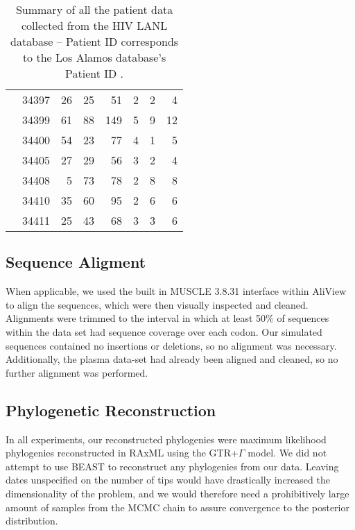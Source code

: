 \begin{table*}[!ht]
\begin{center}
\begin{tabular}{llrrrrrr}
& 34397 &      26 &       25 &       51 &        2 &        2 &        4  \\ 
& 34399 &      61 &       88 &      149 &        5 &        9 &       12  \\ 
& 34400 &      54 &       23 &       77 &        4 &        1 &        5  \\ 
& 34405 &      27 &       29 &       56 &        3 &        2 &        4  \\ 
& 34408 &       5 &       73 &       78 &        2 &        8 &        8 \\ 
& 34410 &      35 &       60 &       95 &        2 &        6 &        6 \\ 
& 34411 &      25 &       43 &       68 &        3 &        3 &        6   \\ \hline
\end{tabular}
\end{center}
  \caption{Summary of all the patient data collected from the HIV LANL database -- Patient ID corresponds to the Los Alamos database's Patient ID \citep{LosAlamos}.
   }\label{tab:patients} 
\end{table*}

\subsection{Sequence Aligment} \label{subsec:seqalign}
When applicable, we used the built in MUSCLE 3.8.31 \citep{Muscle04} interface within AliView \citep{AliView14} to align the sequences, which were then visually inspected and cleaned. 
Alignments were trimmed to the interval in which at least  50\% of sequences within the data set had sequence coverage over each codon.
Our simulated sequences contained no insertions or deletions, so no alignment was necessary. 
Additionally, the plasma data-set \citep{McCloskey14} had already been aligned and cleaned, so no further alignment was performed.


\subsection{Phylogenetic Reconstruction} \label{subsec:phylo}
In all experiments, our reconstructed phylogenies were maximum likelihood phylogenies reconstructed in RAxML \citep{Raxml14} using the GTR+$\Gamma$ model.
We did not attempt to use BEAST \citep{BEAST} to reconstruct any phylogenies from our data.
Leaving dates unspecified on the number of tips would have drastically increased the dimensionality of the problem, and we would therefore need a prohibitively large amount of samples from the MCMC chain to assure convergence to the posterior distribution.


